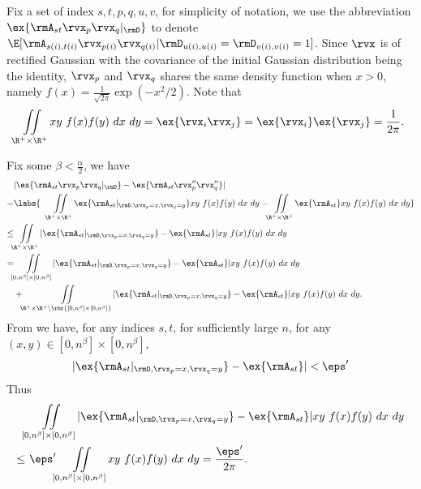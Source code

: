 \begin{proofof}{}
Fix a set of index $s,t,p,q,u,v$, for simplicity of notation, we use the abbreviation $\ex{\rmA_{st}\rvx_p\rvx_q|_\rmD}$ to denote $\E[\rmA_{s(i),t(i)}\rvx_{p(i)}\rvx_{q(i)}|\rmD_{u(i),u(i)}=\rmD_{v(i),v(i)}=1]$. Since $\rvx$ is of rectified Gaussian with the covariance of the initial Gaussian distribution being the identity, $\rvx_p$ and $\rvx_q$ shares the same density function when $x>0$, namely $f(x)=\frac{1}{\sqrt{2\pi}}\exp(-x^2/2)$.
Note that \begin{equation}
\label{eqn:proof-xxexp}
    \iint\limits_{\R^+\times\R^+}xy\ f(x)f(y)\ dx\ dy = \ex{\rvx_i\rvx_j}=\ex{\rvx_i}\ex{\rvx_j} = \frac{1}{2\pi}.
\end{equation}

Fix some $\beta < \frac\alpha2$, we have
\begin{equation}
\label{eqn:poly-bound}
\begin{split}
    &|\ex{\rmA_{st}\rvx_p\rvx_q|_\rmD}-\ex{\rmA_{st}\rvx''_p\rvx''_q}|\\
    =&\labs{\quad\iint\limits_{\R^+\times\R^+} \ex{\rmA_{st}|_{\rmD, \rvx_p=x,\rvx_q=y}}xy\ f(x)f(y)\ dx\ dy - \iint\limits_{\R^+\times\R^+} \ex{\rmA_{st}}xy\ f(x)f(y)\ dx\ dy}\\
    \leq& \iint\limits_{\R^+\times\R^+} |\ex{\rmA_{st}|_{\rmD, \rvx_p=x,\rvx_q=y}}-\ex{\rmA_{st}}|xy\ f(x)f(y)\ dx\ dy\\
    =&\iint\limits_{[0,n^\beta]\times [0,n^\beta]} |\ex{\rmA_{st}|_{\rmD, \rvx_p=x,\rvx_q=y}}-\ex{\rmA_{st}}|xy\ f(x)f(y)\ dx\ dy\\
    &+ \iint\limits_{\R^+\times\R^+\backslash\rbr{[0,n^\beta]\times [0,n^\beta]}} |\ex{\rmA_{st}|_{\rmD, \rvx_p=x,\rvx_q=y}}-\ex{\rmA_{st}}|xy\ f(x)f(y)\ dx\ dy.
\end{split}
\end{equation}
From  we have, for any indices $s,t$, for sufficiently large $n$, for any $(x,y)\in[0,n^\beta]\times [0,n^\beta]$,
\begin{equation}
    |\ex{\rmA_{st}|_{\rmD, \rvx_p=x,\rvx_q=y}}-\ex{\rmA_{st}}| < \eps'
\end{equation}
Thus
\begin{equation}
\begin{split}
    &\iint\limits_{[0,n^\beta]\times [0,n^\beta]} |\ex{\rmA_{st}|_{\rmD, \rvx_p=x,\rvx_q=y}}-\ex{\rmA_{st}}|xy\ f(x)f(y)\ dx\ dy\\
    \leq &\ \eps'\iint\limits_{[0,n^\beta]\times [0,n^\beta]} xy\ f(x)f(y)\ dx\ dy = \frac{\eps'}{2\pi}.
\end{split}

\end{equation}
\end{proofof}
